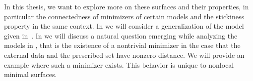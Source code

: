 In this thesis, we want to explore more on these surfaces and their properties, in particular the
connectedness of minimizers of certain models and the stickiness property in the same context. In
 we will consider a generalization of the model given
in~\cite{dipierro2020disconnectedness}. In  we will discuss a
natural question emerging while analyzing the models in , that is the existence of a
nontrivial minimizer in the case that the external data and the prescribed set have nonzero
distance. We will provide an example where such a minimizer exists. This behavior is unique to
nonlocal minimal surfaces.
